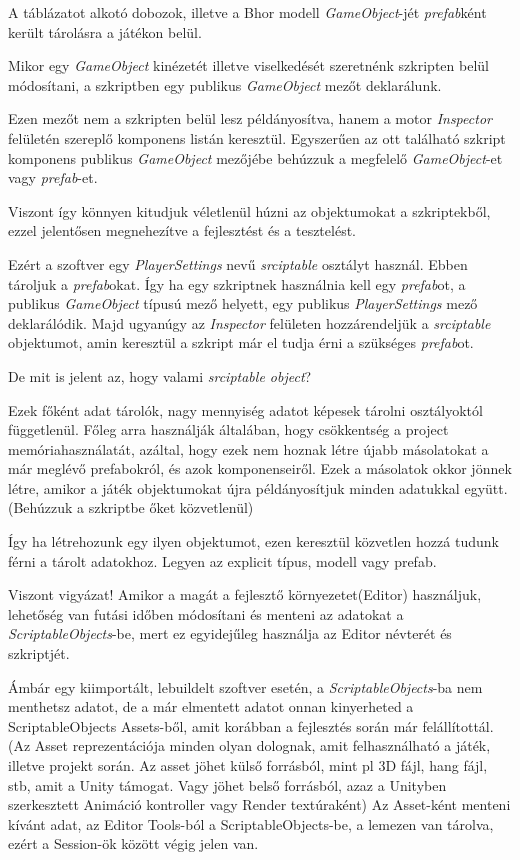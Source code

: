 \documentclass[colorlinks]{thesis-ekf}
\theoremstyle{definition}
\theoremstyle{remark}
\begin{document}
A táblázatot alkotó dobozok, illetve a Bhor modell \textit{GameObject}-jét\textit{ prefab}ként került tárolásra a játékon belül.

Mikor egy \textit{GameObject} kinézetét illetve viselkedését szeretnénk szkripten belül módosítani, a szkriptben egy publikus \textit{GameObject} mezőt deklarálunk.

Ezen mezőt nem a szkripten belül lesz példányosítva, hanem a motor \textit{ Inspector }felületén szereplő komponens listán keresztül. Egyszerűen az ott található szkript komponens publikus \textit{GameObject} mezőjébe behúzzuk a megfelelő \textit{GameObject}-et vagy \textit{prefab}-et.

Viszont így könnyen kitudjuk véletlenül húzni az objektumokat a szkriptekből, ezzel jelentősen megnehezítve a fejlesztést és a tesztelést.

Ezért a szoftver egy \textit{PlayerSettings} nevű \textit{srciptable} osztályt használ. Ebben tároljuk a \textit{prefab}okat. Így ha egy szkriptnek használnia kell egy \textit{prefab}ot, a publikus \textit{GameObject} típusú mező helyett, egy publikus \textit{PlayerSettings} mező deklarálódik. Majd ugyanúgy az \textit{ Inspector } felületen hozzárendeljük a \textit{srciptable} objektumot, amin keresztül a szkript már el tudja érni a szükséges \textit{prefab}ot.

De mit is jelent az, hogy valami \textit{srciptable object}?

Ezek főként adat tárolók, nagy mennyiség adatot képesek tárolni osztályoktól függetlenül. Főleg arra használják általában, hogy csökkentség a project memóriahasználatát, azáltal, hogy ezek nem hoznak létre újabb másolatokat a már meglévő prefabokról, és azok komponenseiről. Ezek a másolatok okkor jönnek létre, amikor a játék objektumokat újra példányosítjuk minden adatukkal együtt. (Behúzzuk a szkriptbe őket közvetlenül) \cite{unity_scriptable}

Így ha létrehozunk egy ilyen objektumot, ezen keresztül közvetlen hozzá tudunk férni a tárolt adatokhoz. Legyen az explicit típus, modell vagy prefab.\cite{unity_scriptable}

Viszont vigyázat! Amikor a magát a fejlesztő környezetet(Editor) használjuk, lehetőség van futási időben módosítani és menteni az adatokat a \textit{ScriptableObjects}-be, mert ez egyidejűleg használja az Editor névterét és szkriptjét.

Ámbár egy kiimportált, lebuildelt szoftver esetén, a \textit{ScriptableObjects}-ba nem menthetsz adatot, de a már elmentett adatot onnan kinyerheted a ScriptableObjects Assets-ből, amit korábban a fejlesztés során már felállítottál. (Az Asset reprezentációja minden olyan dolognak, amit felhasználható a játék, illetve projekt során. Az asset jöhet külső forrásból, mint pl 3D fájl, hang fájl, stb, amit a Unity támogat. Vagy jöhet belső forrásból, azaz a Unityben szerkesztett Animáció kontroller vagy Render textúraként)\cite{unity_asset}
Az Asset-ként menteni kívánt adat, az Editor Tools-ból a ScriptableObjects-be, a lemezen van tárolva, ezért a Session-ök között végig jelen van.
\cite{unity_scriptable}
\end{document}
